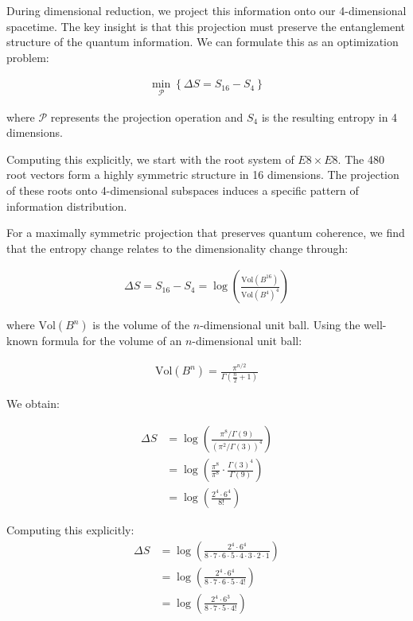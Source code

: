 \documentclass[11pt,english,twoside]{article}
\begin{document}
During dimensional reduction, we project this information onto our 4-dimensional spacetime. The key insight is that this projection must preserve the entanglement structure of the quantum information. We can formulate this as an optimization problem:

\begin{align}
    \min_{\mathcal{P}} \left\{ \Delta S = S_{16} - S_4 \right\}
\end{align}

where $\mathcal{P}$ represents the projection operation and $S_4$ is the resulting entropy in 4 dimensions.

Computing this explicitly, we start with the root system of $E8 \times E8$. The 480 root vectors form a highly symmetric structure in 16 dimensions. The projection of these roots onto 4-dimensional subspaces induces a specific pattern of information distribution.

For a maximally symmetric projection that preserves quantum coherence, we find that the entropy change relates to the dimensionality change through:

\begin{align}
    \Delta S = S_{16} - S_4 = \log\left(\frac{\text{Vol}(B^{16})}{\text{Vol}(B^4)^4}\right)
\end{align}

where $\text{Vol}(B^n)$ is the volume of the $n$-dimensional unit ball. Using the well-known formula for the volume of an $n$-dimensional unit ball:

\begin{align}
    \text{Vol}(B^n) = \frac{\pi^{n/2}}{\Gamma(\frac{n}{2} + 1)}
\end{align}

We obtain:

\begin{align}
    \Delta S &= \log\left(\frac{\pi^{8}/\Gamma(9)}{(\pi^{2}/\Gamma(3))^4}\right)\\
    &= \log\left(\frac{\pi^{8}}{\pi^{8}} \cdot \frac{\Gamma(3)^4}{\Gamma(9)}\right)\\
    &= \log\left(\frac{2^4 \cdot 6^4}{8!}\right)
\end{align}

Computing this explicitly:
\begin{align}
    \Delta S &= \log\left(\frac{2^4 \cdot 6^4}{8 \cdot 7 \cdot 6 \cdot 5 \cdot 4 \cdot 3 \cdot 2 \cdot 1}\right)\\
    &= \log\left(\frac{2^4 \cdot 6^4}{8 \cdot 7 \cdot 6 \cdot 5 \cdot 4!}\right)\\
    &= \log\left(\frac{2^4 \cdot 6^3}{8 \cdot 7 \cdot 5 \cdot 4!}\right)
\end{align}
\end{document}
